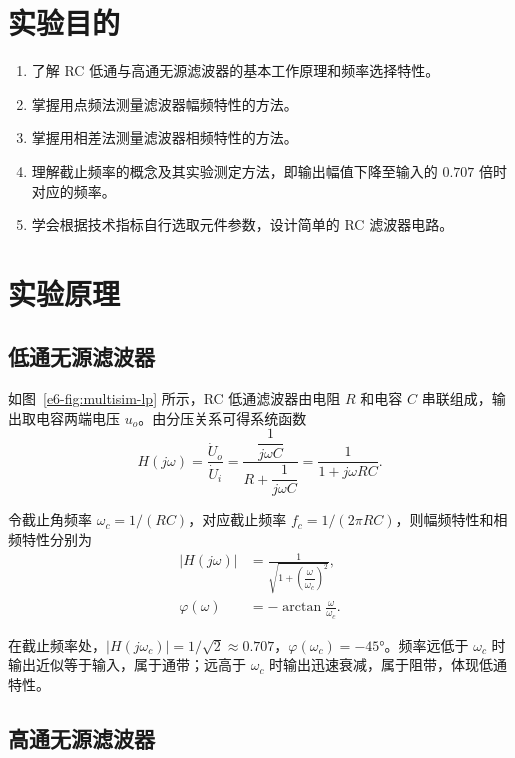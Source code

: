 \section{实验目的}

\begin{enumerate}[label=\arabic*.]
    \item 了解 RC 低通与高通无源滤波器的基本工作原理和频率选择特性。
    \item 掌握用点频法测量滤波器幅频特性的方法。
    \item 掌握用相差法测量滤波器相频特性的方法。
    \item 理解截止频率的概念及其实验测定方法，即输出幅值下降至输入的 \(0.707\) 倍时对应的频率。
    \item 学会根据技术指标自行选取元件参数，设计简单的 RC 滤波器电路。
\end{enumerate}

\section{实验原理}

\subsection{低通无源滤波器}

如图~\ref{e6-fig:multisim-lp} 所示，RC 低通滤波器由电阻 \(R\) 和电容 \(C\) 串联组成，输出取电容两端电压 \(u_o\)。由分压关系可得系统函数
\begin{equation}
    H(j\omega) = \frac{\dot{U}_o}{\dot{U}_i}
    = \frac{\dfrac{1}{j\omega C}}{R+\dfrac{1}{j\omega C}}
    = \frac{1}{1+j\omega RC}.
    \label{e6-eq:lp-tf}
\end{equation}

令截止角频率 \(\omega_c = 1/(RC)\)，对应截止频率 \(f_c = 1/(2\pi RC)\)，则幅频特性和相频特性分别为
\begin{align}
    |H(j\omega)| &= \frac{1}{\sqrt{1+\left(\dfrac{\omega}{\omega_c}\right)^{\!2}}}, \label{e6-eq:lp-mag} \\[6pt]
    \varphi(\omega) &= -\arctan\frac{\omega}{\omega_c}. \label{e6-eq:lp-phase}
\end{align}

在截止频率处，\(|H(j\omega_c)|=1/\sqrt{2}\approx 0.707\)，\(\varphi(\omega_c)=-45°\)。频率远低于 \(\omega_c\) 时输出近似等于输入，属于通带；远高于 \(\omega_c\) 时输出迅速衰减，属于阻带，体现低通特性。

\subsection{高通无源滤波器}


